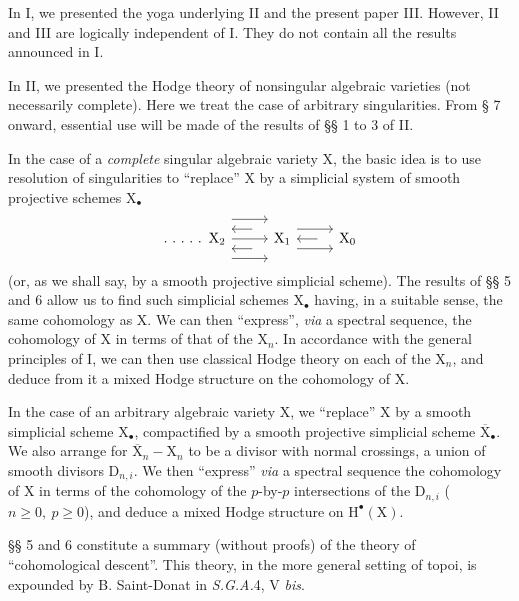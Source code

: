 \documentclass[11pt,leqno]{article}
\begin{document}
In I, we presented the yoga underlying II and the present paper III. However, II and III are logically independent of I. They do not contain all the results announced in I.

In II, we presented the Hodge theory of nonsingular algebraic varieties (not necessarily complete). Here we treat the case of arbitrary singularities. From § 7 onward, essential use will be made of the results of §§ 1 to 3 of II.

In the case of a \textit{complete} singular algebraic variety \(\mathrm{X}\), the basic idea is to use resolution of singularities to “replace” \(\mathrm{X}\) by a simplicial system of smooth projective schemes \(\mathrm{X}_{\bullet}\)
\[
\begin{tikzcd}[column sep=2.6em]
\ldotp\,\ldotp\,\ldotp\,\ldotp\,\ldotp\ \mathrm{X}_2
  \arrow[r, shift left=3.2ex]
  \arrow[r]
  \arrow[r, shift right=3.2ex]
&
\mathrm{X}_1
  \arrow[l, shift right=1.6ex, shorten <=1.1em]
  \arrow[l, shift left=1.6ex, shorten <=1.1em]
  \arrow[r, shift left=1.6ex]
  \arrow[r, shift right=1.6ex]
&
\mathrm{X}_0
  \arrow[l, shorten <=1.1em]
\end{tikzcd}
\]
(or, as we shall say, by a smooth projective simplicial scheme). The results of §§ 5 and 6 allow us to find such simplicial schemes \(\mathrm{X}_{\bullet}\) having, in a suitable sense, the same cohomology as \(\mathrm{X}\). We can then “express”, \textit{via} a spectral sequence, the cohomology of \(\mathrm{X}\) in terms of that of the \(\mathrm{X}_n\). In accordance with the general principles of I, we can then use classical Hodge theory on each of the \(\mathrm{X}_n\), and deduce from it a mixed Hodge structure on the cohomology of \(\mathrm{X}\).

In the case of an arbitrary algebraic variety \(\mathrm{X}\), we “replace” \(\mathrm{X}\) by a smooth simplicial scheme \(\mathrm{X}_{\bullet}\), compactified by a smooth projective simplicial scheme \(\overline{\mathrm{X}}_{\bullet}\). We also arrange for \(\overline{\mathrm{X}}_n-\mathrm{X}_n\) to be a divisor with normal crossings, a union of smooth divisors \(\mathrm{D}_{n,i}\). We then “express” \textit{via} a spectral sequence the cohomology of \(\mathrm{X}\) in terms of the cohomology of the \(p\)-by-\(p\) intersections of the \(\mathrm{D}_{n,i}\) (\(n\geq 0,\ p\geq 0\)), and deduce a mixed Hodge structure on \(\mathrm{H}^{\bullet}(\mathrm{X})\).

§§ 5 and 6 constitute a summary (without proofs) of the theory of “cohomological descent”. This theory, in the more general setting of topoi, is expounded by B. Saint-Donat in \textit{S.G.A.}4, V \textit{bis}.
\end{document}
